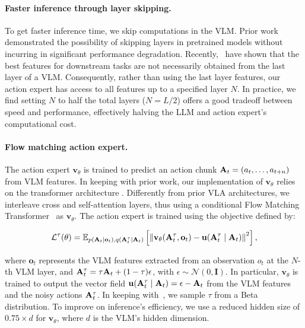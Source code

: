 \paragraph{Faster inference through layer skipping.}
To get faster inference time, we skip computations in the VLM. Prior work~\citep{shukor2024skipping,tang2023you} demonstrated the possibility of skipping layers in pretrained models without incurring in significant performance degradation. 
Recently,~\citep{el2024scalable,bolya2025perception,rajasegaran2025empirical} have shown that the best features for downstream tasks are not necessarily obtained from the last layer of a VLM. 
Consequently, rather than using the last layer features, our action expert has access to all features up to a specified layer \( N \). 
In practice, we find setting \( N \) to half the total layers (\( N=L/2 \)) offers a good tradeoff between speed and performance, effectively halving the LLM and action expert’s computational cost.

\paragraph{Flow matching action expert.}
The action expert \( \mathbf{v}_{\theta} \) is trained to predict an action chunk \( \mathbf{A}_t = ( a_t, \ldots, a_{t+n} ) \) from VLM features.
In keeping with prior work, our implementation of \( \mathbf{v}_\theta \) relies on the transformer architecture \citep{vaswani2017attention}.
Differently from prior VLA architectures, we interleave cross and self-attention layers, thus using a conditional Flow Matching Transformer~\citep{esser2024scaling,liu2022rectified,lipman2022flow} as \(  \mathbf{v}_{\theta} \). 
The action expert is trained using the objective defined by:

\begin{equation*}
\mathcal L ^\tau(\theta) = \mathbb{E}_{p(\mathbf{A}_t \mid \mathbf{o}_t), q(\mathbf{A}_t^\tau \mid \mathbf{A}_t)} \left[ \left\| \mathbf{v}_{\theta}(\mathbf{A}_t^\tau, \mathbf{o}_t) - \mathbf{u}(\mathbf{A}_t^\tau \mid \mathbf{A}_t) \right\|^2 \right],
\end{equation*}

where $\mathbf{o}_t$ represents the VLM features extracted from an observation \( o_t \) at the \( N \)-th VLM layer, and \( \mathbf{A}_t^\tau = \tau \mathbf{A}_t + (1 - \tau) \epsilon \), with \( \epsilon \sim \mathcal{N}(0, \mathbf{I}) \). 
In particular, \( \mathbf{v}_{\theta} \) is trained to output the vector field \( \mathbf{u}(\mathbf{A}_t^\tau \mid \mathbf{A}_t) = \epsilon - \mathbf{A}_t \) from the VLM features and the noisy actions \( \mathbf{A}_t^\tau \). 
In keeping with~\citet{black2024pi_0}, we sample \( \tau \) from a Beta distribution. To improve on inference's efficiency, we use a reduced hidden size of \( 0.75 \times d \) for \( \mathbf{v}_\theta \), where \( d \) is the VLM's hidden dimension.


